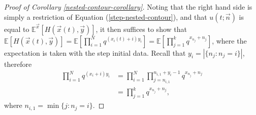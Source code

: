 \begin{proof}[Proof of Corollary \ref{nested-contour-corollary}]
Noting that the right hand side is simply a restriction of Equation (\ref{step-nested-contour}), and that $u(t;\vec{n})$ is equal to $\mathbb{E}^{\vec{x}}[H(\vec{x}(t), \vec{y})]$, it then suffices to show that $\mathbb{E}[H(\vec{x}(t), \vec{y})] =\mathbb{E} \left[ \prod_{i=1}^N q^{(x_i(t) + i) y_i} \right]= \mathbb{E} \left[ \prod_{j=1}^k q^{x_{n_j}+n_j} \right]$, where the expectation is taken with the step initial data. Recall that $y_i = |\{n_j: n_j = i\}|$, therefore
\begin{align*}
\prod_{i=1}^N q^{(x_i + i) y_i} &= \prod_{i=1}^{N} \prod_{j=n_{i,1}}^{n_{i,1}+y_i-1} q^{x_{n_j} + n_j}\\
																&= \prod_{j=1}^k q^{x_{n_j}+n_j},
\end{align*}
where $n_{i,1} = \min \{j : n_j = i\}$.
\end{proof}

